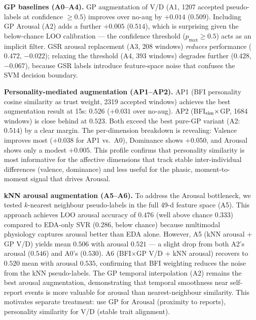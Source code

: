 \documentclass[sigconf,nonacm]{acmart}
\begin{document}
\textbf{GP baselines (A0--A4).}
GP augmentation of V/D (A1, 1207 accepted pseudo-labels at confidence $\geq 0.5$)
improves over no-aug by $+0.014$ ($0.509$).
Including GP Arousal (A2) adds a further $+0.005$ ($0.514$), which is
surprising given the below-chance LOO calibration --- the confidence threshold
($p_{\max} \geq 0.5$) acts as an implicit filter.
GSR arousal replacement (A3, 208 windows) \emph{reduces} performance
($0.472$, $-0.022$); relaxing the threshold (A4, 393 windows) degrades further
($0.428$, $-0.067$), because GSR labels introduce feature-space noise that
confuses the SVM decision boundary.

\textbf{Personality-mediated augmentation (AP1--AP2).}
AP1 (BFI personality cosine similarity as trust weight, 2319 accepted windows)
achieves the best augmentation result at 15s: $0.526$ ($+0.031$ over no-aug).
AP2 (BFI$_{\rm sim}\times$GP, 1684 windows) is close behind at $0.523$.
Both exceed the best pure-GP variant (A2: $0.514$) by a clear margin.
The per-dimension breakdown is revealing: Valence improves most
($+0.038$ for AP1 vs.\ A0), Dominance shows $+0.050$, and Arousal shows only
a modest $+0.005$.
This profile confirms that personality similarity is most informative for the
affective dimensions that track stable inter-individual differences (valence,
dominance) and less useful for the phasic, moment-to-moment signal that drives
Arousal.

\textbf{kNN arousal augmentation (A5--A6).}
To address the Arousal bottleneck, we tested $k$-nearest neighbour pseudo-labels
in the full 49-d feature space (A5).
This approach achieves LOO arousal accuracy of $0.476$ (well above chance $0.333$)
compared to EDA-only SVR ($0.286$, below chance) because multimodal physiology
captures arousal better than EDA alone.
However, A5 (kNN arousal + GP V/D) yields mean $0.506$ with arousal $0.521$
--- a slight drop from both A2's arousal ($0.546$) and A0's ($0.530$).
A6 (BFI$\times$GP V/D + kNN arousal) recovers to $0.520$ mean with arousal
$0.535$, confirming that BFI weighting reduces the noise from the kNN
pseudo-labels.
The GP temporal interpolation (A2) remains the best arousal augmentation,
demonstrating that temporal smoothness near self-report events is more
valuable for arousal than nearest-neighbour similarity.
This motivates separate treatment: use GP for Arousal (proximity to reports),
personality similarity for V/D (stable trait alignment).
\end{document}
